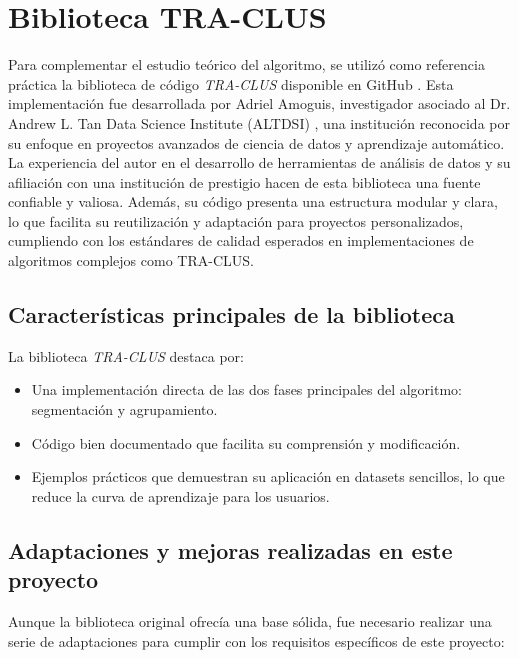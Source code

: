 \section{Biblioteca TRA-CLUS}

Para complementar el estudio teórico del algoritmo, se utilizó como referencia práctica la biblioteca de código \emph{TRA-CLUS} disponible en GitHub \cite{traclus_library}. Esta implementación fue desarrollada por Adriel Amoguis, investigador asociado al Dr. Andrew L. Tan Data Science Institute (ALTDSI) \cite{altdsi}, una institución reconocida por su enfoque en proyectos avanzados de ciencia de datos y aprendizaje automático. La experiencia del autor en el desarrollo de herramientas de análisis de datos y su afiliación con una institución de prestigio hacen de esta biblioteca una fuente confiable y valiosa. Además, su código presenta una estructura modular y clara, lo que facilita su reutilización y adaptación para proyectos personalizados, cumpliendo con los estándares de calidad esperados en implementaciones de algoritmos complejos como TRA-CLUS.

\subsection{Características principales de la biblioteca}

La biblioteca \emph{TRA-CLUS} destaca por:

\begin{itemize}
    \item Una implementación directa de las dos fases principales del algoritmo: segmentación y agrupamiento.
    \item Código bien documentado que facilita su comprensión y modificación.
    \item Ejemplos prácticos que demuestran su aplicación en datasets sencillos, lo que reduce la curva de aprendizaje para los usuarios.
\end{itemize}

\subsection{Adaptaciones y mejoras realizadas en este proyecto}

Aunque la biblioteca original ofrecía una base sólida, fue necesario realizar una serie de adaptaciones para cumplir con los requisitos específicos de este proyecto:

